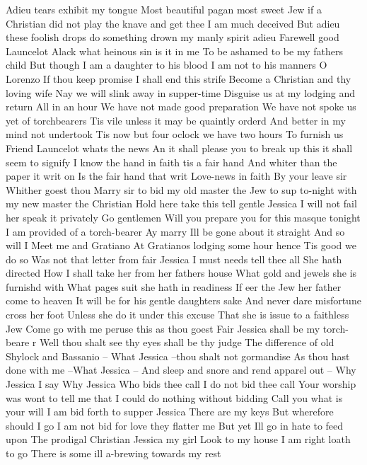 Adieu tears exhibit my tongue Most beautiful 
pagan most sweet Jew if a Christian did not play 
the knave and get thee I am much deceived But 
adieu these foolish drops do something drown my 
manly spirit adieu 
Farewell good Launcelot 
Alack what heinous sin is it in me 
To be ashamed to be my fathers child 
But though I am a daughter to his blood 
I am not to his manners O Lorenzo 
If thou keep promise I shall end this strife 
Become a Christian and thy loving wife 
Nay we will slink away in supper-time 
Disguise us at my lodging and return 
All in an hour 
We have not made good preparation 
We have not spoke us yet of torchbearers 
Tis vile unless it may be quaintly orderd 
And better in my mind not undertook 
Tis now but four oclock we have two hours 
To furnish us 
Friend Launcelot whats the news 
An it shall please you to break up 
this it shall seem to signify 
I know the hand in faith tis a fair hand 
And whiter than the paper it writ on 
Is the fair hand that writ 
Love-news in faith 
By your leave sir 
Whither goest thou 
Marry sir to bid my old master the 
Jew to sup to-night with my new master the Christian 
Hold here take this tell gentle Jessica 
I will not fail her speak it privately 
Go gentlemen 
Will you prepare you for this masque tonight 
I am provided of a torch-bearer 
Ay marry Ill be gone about it straight 
And so will I 
Meet me and Gratiano 
At Gratianos lodging some hour hence 
Tis good we do so 
Was not that letter from fair Jessica 
I must needs tell thee all She hath directed 
How I shall take her from her fathers house 
What gold and jewels she is furnishd with 
What pages suit she hath in readiness 
If eer the Jew her father come to heaven 
It will be for his gentle daughters sake 
And never dare misfortune cross her foot 
Unless she do it under this excuse 
That she is issue to a faithless Jew 
Come go with me peruse this as thou goest 
Fair Jessica shall be my torch-beare r 
Well thou shalt see thy eyes shall be thy judge 
The difference of old Shylock and Bassanio -- 
What Jessica --thou shalt not gormandise 
As thou hast done with me --What Jessica -- 
And sleep and snore and rend apparel out -- 
Why Jessica I say 
Why Jessica 
Who bids thee call I do not bid thee call 
Your worship was wont to tell me that 
I could do nothing without bidding 
Call you what is your will 
I am bid forth to supper Jessica 
There are my keys But wherefore should I go 
I am not bid for love they flatter me 
But yet Ill go in hate to feed upon 
The prodigal Christian Jessica my girl 
Look to my house I am right loath to go 
There is some ill a-brewing towards my rest 
